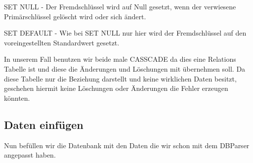SET NULL - Der Fremdschlüssel wird auf Null gesetzt, wenn der verwiesene Primärschlüssel gelöscht wird oder sich ändert.

SET DEFAULT - Wie bei SET NULL nur hier wird der Fremdschlüssel auf den voreingestellten Standardwert gesetzt.

In unserem Fall benutzen wir beide male CASSCADE da dies eine Relations Tabelle ist und diese die Änderungen und Löschungen mit übernehmen soll. Da diese Tabelle nur die Beziehung darstellt und keine wirklichen Daten besitzt, geschehen hiermit keine Löschungen oder Änderungen die Fehler erzeugen könnten.


\subsection{Daten einfügen}

Nun befüllen wir die Datenbank mit den Daten die wir schon mit dem DBParser angepasst haben.












